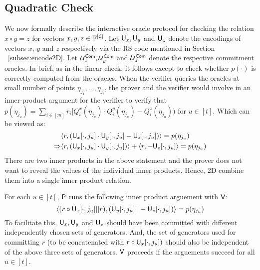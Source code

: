 \subsection{Quadratic Check}\label{subsec:quadcheck2D}
We now formally describe the interactive oracle protocol for checking the relation $x\circ y = z$ for vectors $x,y,z\in \mathbb{F}^{\mathsf{|C|}}$. Let $\mathsf{U}_x, \mathsf{U}_y$ and $\mathsf{U}_z$ denote the encodings of vectors $x$, $y$ and $z$ respectively via the RS code mentioned in Section ~\ref{subsec:encode2D}. Let $\mathcal{U}^{\mathsf{Com}}_x,\mathcal{U}^{\mathsf{Com}}_y$ and $\mathcal{U}^{\mathsf{Com}}_z$ denote the respective commitment oracles. In brief, as in the linear check, it follows \cite{ligero} except to check whether $p(\cdot)$ is correctly computed from the oracles. When the verifier queries the oracles at small number of points $\eta_{j_1} , \ldots , \eta_{j_t}$, the prover and the verifier would involve in an inner-product argument for the verifier to verify that $p(\eta_{j_u})=\sum_{i\in [m]}r_i[Q^x_i(\eta_{j_u}) \cdot Q^y_i(\eta_{j_u})-Q^z_i(\eta_{j_u}))$ for $u\in [t]$.
Which can be viewed as:
\begin{align*}
&\langle r,(\mathsf{U}_x[\cdot,j_u]\cdot \mathsf{U}_y[\cdot,j_u] - \mathsf{U}_z[\cdot,j_u])\rangle = p(\eta_{j_u}) \\
\Rightarrow &\langle r,(\mathsf{U}_x[\cdot,j_u]\cdot \mathsf{U}_y[\cdot,j_u])\rangle + \langle r,-\mathsf{U}_z[\cdot,j_u]\rangle = p(\eta_{j_u})
\end{align*}
There are two inner products in the above statement and the prover does not want to reveal the values of the individual inner products. Hence, \name2D combine them into a single inner product relation.

For each $u\in[t]$, $\mathsf{P}$ runs the following inner product arguement with $\mathsf{V}$:
$$\langle (r\circ \mathsf{U}_x[\cdot,j_u]||r),(\mathsf{U}_y[\cdot,j_u]||-\mathsf{U}_z[\cdot,j_u])\rangle = p(\eta_{j_u})$$
To facilitate this, $\mathsf{U}_x, \mathsf{U}_y$ and $\mathsf{U}_z$ should have been committed with different independently chosen sets of generators. And, the set of generators used for committing $r$ (to be concatenated with $r \circ \mathsf{U}_x [\cdot, j_u])$ should also be independent of the above three sets of generators. $\mathsf{V}$ proceeds if the arguements succeed for all $u\in[t]$.

